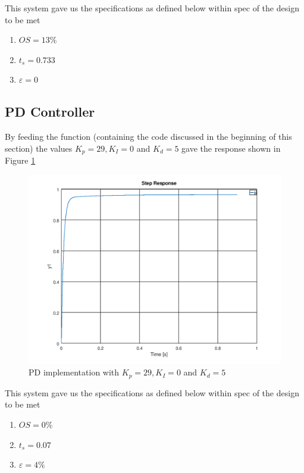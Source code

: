 \documentclass[a4paper, 12pt]{article}
\begin{document}
This system gave us the specifications as defined below within spec of the design to be met
\begin{enumerate}
	\item $OS = 13\%$
	\item $t_s = 0.733$
	\item $\varepsilon = 0$
\end{enumerate}


\subsection{PD Controller} %
\label{sub:pd_controller}
By feeding the function (containing the code discussed in the beginning of this section) the values $K_p = 29, K_I = 0$ and $K_d = 5$ gave the response shown in Figure \ref{fig:question_4_pd}

\begin{figure}[H]
	\centering
	\includegraphics[width=\textwidth]{Images/question_4_PD.png}
	\caption{PD implementation with $K_p = 29, K_I = 0$ and $K_d = 5$}
	\label{fig:question_4_pd}
\end{figure}

This system gave us the specifications as defined below within spec of the design to be met
\begin{enumerate}
	\item $OS = 0\%$
	\item $t_s = 0.07$
	\item $\varepsilon = 4\%$
\end{enumerate}
\end{document}
